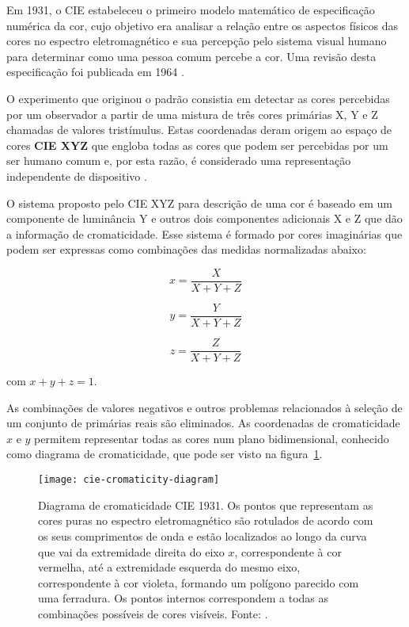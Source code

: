 Em 1931, o CIE estabeleceu o primeiro modelo matemático de especificação numérica da cor, cujo objetivo era analisar a relação entre os aspectos físicos das cores no espectro eletromagnético e sua percepção pelo sistema visual humano para determinar como uma pessoa comum percebe a cor. Uma revisão desta especificação foi publicada em 1964 \citep{gonzalez:02}.

O experimento que originou o padrão consistia em detectar as cores percebidas por um observador a partir de uma mistura de três cores primárias X, Y e Z chamadas de valores tristímulus. Estas coordenadas deram origem ao espaço de cores \textbf{CIE XYZ} que engloba todas as cores que podem ser percebidas por um ser humano comum e, por esta razão, é considerado uma representação independente de dispositivo \citep{konstantinos:00}.

O sistema proposto pelo CIE XYZ para descrição de uma cor é baseado em um componente de luminância Y e outros dois componentes adicionais X e Z que dão a informação de cromaticidade. Esse sistema é formado por cores imaginárias que podem ser expressas como combinações das medidas normalizadas abaixo:


\begin{equation}
  x = \frac{X}{X + Y + Z}
\end{equation}

\begin{equation}
  y = \frac{Y}{X + Y + Z}
\end{equation}

\begin{equation}
  z = \frac{Z}{X + Y + Z}
\end{equation}

com $x + y+ z = 1$.

As combinações de valores negativos e outros problemas relacionados à seleção de um conjunto de primárias reais são eliminados.  As coordenadas de cromaticidade $x$ e $y$ permitem representar todas as cores num plano bidimensional, conhecido como diagrama de cromaticidade, que pode ser visto na figura~\ref{fig:cie-cromaticity-diagram}.

\begin{figure}[!h]
  \centering
  \texttt{[image: cie-cromaticity-diagram]}
  \caption[Diagrama de cromaticidade CIE 1931]{Diagrama de cromaticidade CIE 1931. Os pontos que representam as cores puras no espectro eletromagnético são rotulados de acordo com os seus comprimentos de onda e estão localizados ao longo da curva que vai da extremidade direita do eixo $x$, correspondente à cor vermelha, até a extremidade esquerda do mesmo eixo, correspondente à cor violeta, formando um polígono parecido com uma ferradura. Os pontos internos correspondem a todas as combinações possíveis de cores visíveis. Fonte: \citet{ben:09}.}
  \label{fig:cie-cromaticity-diagram} 
\end{figure}

